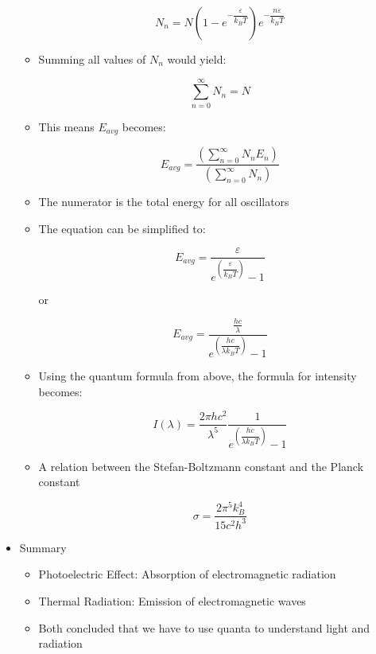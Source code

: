 \begin{itemize}
\begin{itemize}
        $$\boxed{N_n=N\left(1-e^{-\dfrac{\varepsilon}{k_BT}}\right)e^{-\dfrac{n\varepsilon}{k_BT}}}$$

      \item Summing all values of $N_n$ would yield:

        $$\sum_{n=0}^{\infty}N_n=N$$

      \item This means $E_{avg}$ becomes:

        $$\boxed{E_{avg}=\dfrac{\left(\displaystyle \sum_{n=0}^{\infty}N_nE_n\right)}{\left(\displaystyle \sum_{n=0}^{\infty} N_n \right)}}$$

      \item The numerator is the total energy for all oscillators

      \item The equation can be simplified to:

        $$\boxed{E_{avg}=\dfrac{\varepsilon}{e^{\left(\dfrac{\varepsilon}{k_BT}\right)}-1}}$$

        \begin{center}
          or
        \end{center}

        \vspace{-12pt}

        $$\boxed{E_{avg}=\dfrac{\frac{hc}{\lambda}}{e^{\left(\dfrac{hc}{\lambda k_BT}\right)}-1}}$$

      \item Using the quantum formula from above, the formula for intensity becomes:

        $$\boxed{I(\lambda)=\dfrac{2\pi hc^2}{\lambda^5}\dfrac{1}{e^{\left(\dfrac{hc}{\lambda k_BT}\right)}-1}}$$

      \item A relation between the Stefan-Boltzmann constant and the Planck constant

        $$\boxed{\sigma=\dfrac{2\pi^5k_B^4}{15c^2h^3}}$$

    \end{itemize}

  \item Summary

    \begin{itemize}

      \item Photoelectric Effect: Absorption of electromagnetic radiation

      \item Thermal Radiation: Emission of electromagnetic waves

      \item Both concluded that we have to use quanta to understand light and radiation

    \end{itemize}

\end{itemize}



